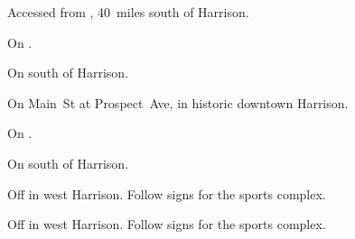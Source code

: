 
\begin{LocationList}

Accessed from , 40~miles south of Harrison.

On   .

On    south of Harrison.

On Main~St at Prospect~Ave, in historic downtown Harrison.

On   .

\Location{\TruckStop \Gas \Rest \Service \Weigh}
On  south of Harrison.

Off    in west Harrison.
Follow signs for the sports complex.

Off    in west Harrison.
Follow signs for the sports complex.

\end{LocationList}
